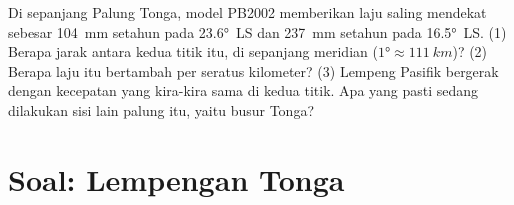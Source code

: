 \begin{exercise}[$\star\star\star$]\label{exo:g11:subduction-zones:15}
Di sepanjang Palung Tonga, model PB2002 memberikan laju saling mendekat sebesar
\qty{104}{mm} setahun pada \ang{23.6}~LS dan \qty{237}{mm} setahun pada
\ang{16.5}~LS. (1) Berapa jarak antara kedua titik itu, di sepanjang meridian
($\ang{1} \approx \qty{111}{km}$)? (2) Berapa laju itu bertambah per seratus
kilometer? (3) Lempeng Pasifik bergerak dengan kecepatan yang kira-kira sama di
kedua titik. Apa yang pasti sedang dilakukan sisi lain palung itu, yaitu busur
Tonga?
\end{exercise}

\section{Soal: Lempengan Tonga}

